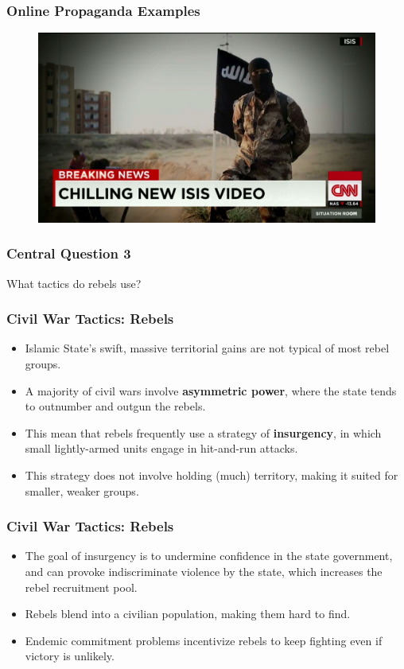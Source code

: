 \documentclass{beamer}
\begin{document}
\begin{frame} 
	\frametitle{\LARGE{Online Propaganda Examples}}
	\begin{figure}[ht!]
		\centering
		\includegraphics[width=\textwidth,height=0.9\textheight,keepaspectratio]{ISISprop2.jpg}
	\end{figure}
\end{frame}

\begin{frame} 
	\frametitle{\LARGE{Central Question 3}}
	\centering
	\Large{What tactics do rebels use?} 
\end{frame}

\begin{frame} 
	\frametitle{\LARGE{Civil War Tactics: Rebels}}
	\begin{itemize}
		\item Islamic State's swift, massive territorial gains are not typical of most rebel groups.
		\item A majority of civil wars involve \textbf{asymmetric power}, where the state tends to outnumber and outgun the rebels. \pause 
		\item This mean that rebels frequently use a strategy of \textbf{insurgency}, in which small lightly-armed units engage in hit-and-run attacks. \pause 
		\item This strategy does not involve holding (much) territory, making it suited for smaller, weaker groups.  
	\end{itemize}
\end{frame}

\begin{frame} 
	\frametitle{\LARGE{Civil War Tactics: Rebels}}
	\begin{itemize}
		\item The goal of insurgency is to undermine confidence in the state government, and can provoke indiscriminate violence by the state, which increases the rebel recruitment pool. \pause
		\item Rebels blend into a civilian population, making them hard to find. \pause
		\item Endemic commitment problems incentivize rebels to keep fighting even if victory is unlikely.
	\end{itemize}
\end{frame}
\end{document}
